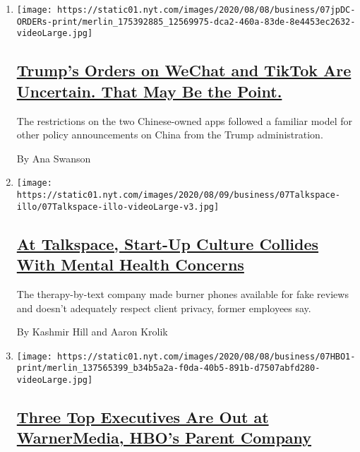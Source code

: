 \begin{enumerate}
\def\labelenumi{\arabic{enumi}.}
\item
  \texttt{[image: https://static01.nyt.com/images/2020/08/08/business/07jpDC-ORDERs-print/merlin\_175392885\_12569975-dca2-460a-83de-8e4453ec2632-videoLarge.jpg]}

  \hypertarget{trumps-orders-on-wechat-and-tiktok-are-uncertain-that-may-be-the-point}{%
  \subsection{\texorpdfstring{\href{/2020/08/07/business/economy/trump-executive-order-tiktok-wechat.html}{Trump's
  Orders on WeChat and TikTok Are Uncertain. That May Be the
  Point.}}{Trump's Orders on WeChat and TikTok Are Uncertain. That May Be the Point.}}\label{trumps-orders-on-wechat-and-tiktok-are-uncertain-that-may-be-the-point}}

  The restrictions on the two Chinese-owned apps followed a familiar
  model for other policy announcements on China from the Trump
  administration.

  By Ana Swanson
\item
  \texttt{[image: https://static01.nyt.com/images/2020/08/09/business/07Talkspace-illo/07Talkspace-illo-videoLarge-v3.jpg]}

  \hypertarget{at-talkspace-start-up-culture-collides-with-mental-health-concerns}{%
  \subsection{\texorpdfstring{\href{/2020/08/07/technology/talkspace.html}{At
  Talkspace, Start-Up Culture Collides With Mental Health
  Concerns}}{At Talkspace, Start-Up Culture Collides With Mental Health Concerns}}\label{at-talkspace-start-up-culture-collides-with-mental-health-concerns}}

  The therapy-by-text company made burner phones available for fake
  reviews and doesn't adequately respect client privacy, former
  employees say.

  By Kashmir Hill and Aaron Krolik
\item
  \texttt{[image: https://static01.nyt.com/images/2020/08/08/business/07HBO1-print/merlin\_137565399\_b34b5a2a-f0da-40b5-891b-d7507abfd280-videoLarge.jpg]}

  \hypertarget{three-top-executives-are-out-at-warnermedia-hbos-parent-company}{%
  \subsection{\texorpdfstring{\href{/2020/08/07/business/media/hbo-warnermedia-executive-departure.html}{Three
  Top Executives Are Out at WarnerMedia, HBO's Parent
  Company}}{Three Top Executives Are Out at WarnerMedia, HBO's Parent Company}}\label{three-top-executives-are-out-at-warnermedia-hbos-parent-company}}


\end{enumerate}
